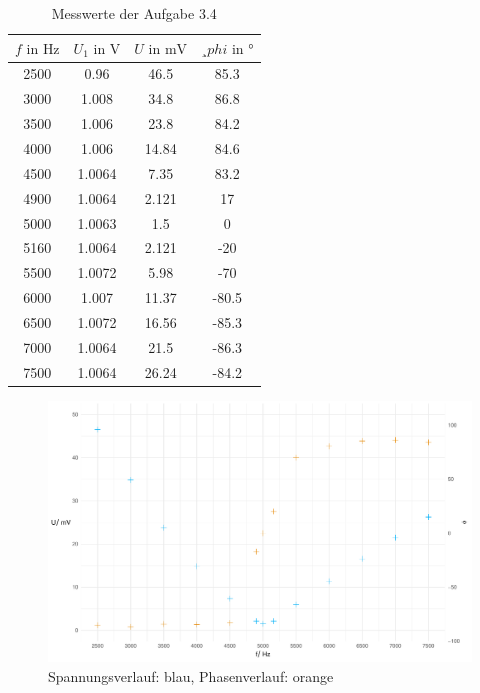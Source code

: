 \documentclass[a4paper, 12pt]{article}
\begin{document}
    \begin{table}[H]
      \begin{center}
        \begin{tabular}{@{}cccc@{}}
        \toprule
            $f \text{ in } \si{\hertz}$   &    $U_1 \text{ in } \si{\volt}$    &   $U \text{ in } \si{\milli\volt}$    &    $ ¸phi \text{ in } \si{\degree}$   \\ \midrule
          2500 & 0.96   & 46.5  & 85.3  \\
          3000 & 1.008  & 34.8  & 86.8  \\
          3500 & 1.006  & 23.8  & 84.2  \\
          4000 & 1.006  & 14.84 & 84.6  \\
          4500 & 1.0064 & 7.35  & 83.2  \\
          4900 & 1.0064 & 2.121 & 17    \\
          5000 & 1.0063 & 1.5   & 0     \\
          5160 & 1.0064 & 2.121 & -20   \\
          5500 & 1.0072 & 5.98  & -70   \\
          6000 & 1.007  & 11.37 & -80.5 \\
          6500 & 1.0072 & 16.56 & -85.3 \\
          7000 & 1.0064 & 21.5  & -86.3 \\
          7500 & 1.0064 & 26.24 & -84.2 \\ \bottomrule
        \end{tabular}
        \caption*{Messwerte der Aufgabe 3.4}
      \end{center}
    \end{table}

    \begin{figure}[H]
      \begin{center}
      \includegraphics[scale=0.3819660112501051]{./R/3_4/3_4.pdf}
      \caption*{ Spannungsverlauf: blau, Phasenverlauf: orange}
      \end{center}
    \end{figure}
\end{document}
